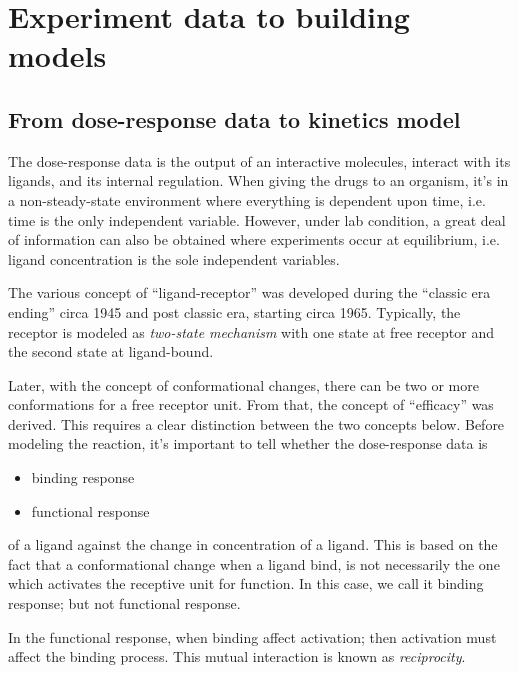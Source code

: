 \chapter{Experiment data to building models}


\section{From dose-response data to kinetics model}
\label{chap:from-dose-response}

The dose-response data is the output of an interactive molecules,
interact with its ligands, and its internal regulation. When giving
the drugs to an organism, it's in a non-steady-state environment where
everything is dependent upon time, i.e. time is the only independent
variable. However, under lab condition, a great deal of information
can also be obtained where experiments occur at equilibrium,
i.e. ligand concentration is the sole independent variables. 


The various concept of ``ligand-receptor'' was developed during the
``classic era ending'' circa 1945 and post classic era, starting circa
1965. Typically, the receptor is modeled as {\it two-state mechanism}
with one state at free receptor and the second state at ligand-bound. 

Later, with the concept of conformational changes, there can be two or
more conformations for a free receptor unit. From that, the concept of
``efficacy'' was derived. This requires a clear distinction between
the two concepts below. Before modeling the reaction, it's important
to tell whether the dose-response data is
\begin{itemize}
\item binding response
\item functional response
\end{itemize}
of a ligand against the change in concentration of a ligand. This is
based on the fact that a conformational change when a ligand bind,
is not necessarily the one which activates the receptive unit for
function. In this case, we call it binding response; but not
functional response. 

In the functional response, when binding affect activation; then
activation must affect the binding process. This mutual interaction is
known as {\it reciprocity}.


